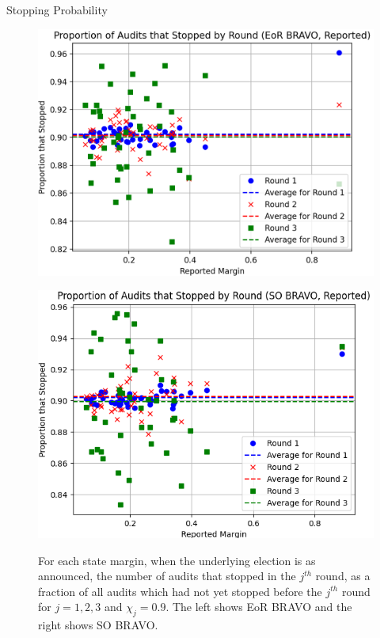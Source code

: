 \documentclass[final]{beamer}
\newcommand{\BRAVO}{\textsc{BRAVO}\xspace}
\newlength{\colwidth}
\begin{document}
\begin{frame}[t]
\begin{columns}[t]
\begin{column}{\colwidth}
\begin{block}{Stopping Probability}
\begin{figure}[h]
\centering
\begin{minipage}{.49\textwidth}
\includegraphics[width=1.0\textwidth]{eor_bravo_90perc_10^4_corrected/sprob_first_three_cropped.png}
\label{fig:eor_bravo_sprob}
\end{minipage}
\begin{minipage}{.49\textwidth}
\includegraphics[width=1.0\textwidth]{so_bravo_90perc_10^4/sprob_first_three.png}
\label{fig:so_bravo_sprob}
\end{minipage}
\caption{For each state margin, when the underlying election is as announced, the number of audits that stopped in the $j^{th}$ round, as a fraction of all audits which had not yet stopped before the $j^{th}$ round for $j=1,2,3$ and $\chi_j=0.9$. The left shows EoR \BRAVO and the right shows SO \BRAVO.}
\end{figure}


\end{block}
\end{column}
\end{columns}
\end{frame}
\end{document}
